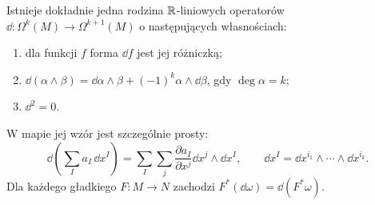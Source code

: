 \begin{twierdzenie}
\label{thm:formy-d}
Istnieje dokładnie jedna rodzina $\mathbb{R}$-liniowych
operatorów $\dd:\Omega^k(M)\to\Omega^{k+1}(M)$
o następujących własnościach:
\begin{enumerate}[leftmargin=*]
\item dla funkcji $f$ forma $\dd f$ jest jej różniczką;
\item $\dd(\alpha\wedge\beta)=\dd\alpha\wedge\beta
 +(-1)^k\alpha\wedge\dd\beta$, gdy $\deg\alpha=k$;
\item $\dd^2=0$.
\end{enumerate}
W mapie jej wzór jest szczególnie prosty:
\begin{equation}\label{eq:zewnetrzna-lokalnie}
 \dd\!\left(\sum_I a_I\,\dd x^I\right)
  =\sum_I\sum_j\frac{\partial a_I}{\partial x^j}
     \dd x^j\wedge\dd x^I,
 \qquad \dd x^I=\dd x^{i_1}\wedge\cdots\wedge\dd x^{i_k}.
\end{equation}
Dla każdego gładkiego $F:M\to N$ zachodzi
$F^*(\dd\omega)=\dd(F^*\omega)$.
\end{twierdzenie}
